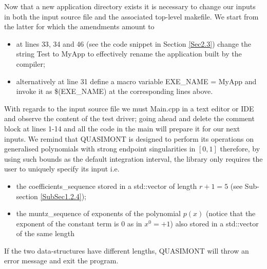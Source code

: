 \documentclass[a4paper, twosided]{book}
\begin{document}
\noindent
Now that a new application directory exists it is necessary to change our inputs in both the input source file and the associated top-level \colorbox{poliGrayBlue}{makefile}. We start from the latter for which the amendments amount to

\begin{itemize}
    \item at lines \colorbox{poliGrayBlue}{33}, \colorbox{poliGrayBlue}{34} and \colorbox{poliGrayBlue}{46} (see the code snippet in Section \ref{Sec2.3}) change the string \colorbox{poliGrayBlue}{Test} to \colorbox{poliGrayBlue}{MyApp} to effectively rename the application built by the compiler;
    \item alternatively at line \colorbox{poliGrayBlue}{31} define a macro variable \colorbox{poliGrayBlue}{EXE\_NAME = MyApp} and invoke it as \colorbox{poliGrayBlue}{\$(EXE\_NAME)} at the corresponding lines above.
\end{itemize}

\noindent
With regards to the input source file we must \colorbox{poliGrayBlue}{Main.cpp} in a text editor or IDE and observe the content of the test driver; going ahead and delete the comment block at lines \colorbox{poliGrayBlue}{1-14} and all the code in the \colorbox{poliGrayBlue}{main} will prepare it for our next inputs. We remind that QUASIMONT is designed to perform its operations on generalised polynomials with strong endpoint singularities in $[0,1]$ therefore, by using such bounds as the default integration interval, the library only requires the user to uniquely specify its input i.e.

\begin{itemize}
    \item the \colorbox{poliGrayBlue}{coefficients\_sequence} stored in a \colorbox{poliGrayBlue}{std::vector} of length $r+1=5$ (see Sub-section \ref{SubSec1.2.4});
    \item the \colorbox{poliGrayBlue}{muntz\_sequence} of exponents of the polynomial $p(x)$ (notice that the exponent of the constant term is $0$ as in $x^0 = +1$) also stored in a \colorbox{poliGrayBlue}{std::vector} of the same length
\end{itemize}

\noindent
If the two data-structures have different lengths, QUASIMONT will throw an error message and exit the program.

\vspace{0.25cm}
\vspace{0.5cm}
\end{document}
